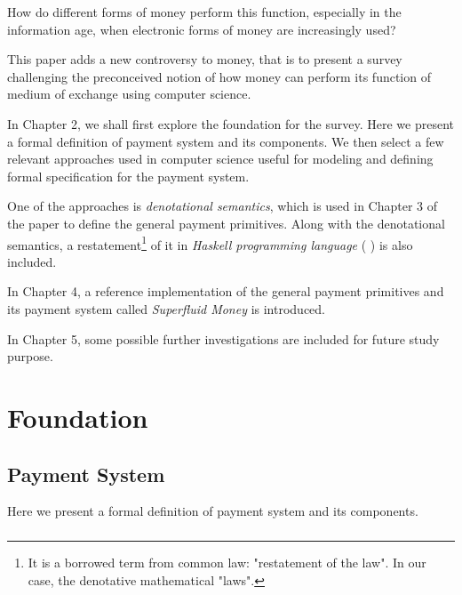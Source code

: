 \documentclass[a4paper,10pt]{report}
\begin{document}
How do different forms of money perform this function, especially in the information age, when electronic forms of money
are increasingly used?

This paper adds a new controversy to money, that is to present a survey challenging the preconceived notion of how money
can perform its function of medium of exchange using computer science.

In Chapter 2, we shall first explore the foundation for the survey. Here we present a formal definition of payment
system and its components. We then select a few relevant approaches used in computer science useful for modeling and
defining formal specification for the payment system.

One of the approaches is \textit{denotational semantics}, which is used in Chapter 3 of the paper to define the general
payment primitives. Along with the denotational semantics, a restatement\footnote{It is a borrowed term from common law:
"restatement of the law". In our case, the denotative mathematical "laws".} of it in \textit{Haskell programming
    language} (\cite{hudak1992report} \cite{jones2003haskell} \cite{marlow2010haskell}) is also included.

In Chapter 4, a reference implementation of the general payment primitives and its payment system called
\textit{Superfluid Money} is introduced.

In Chapter 5, some possible further investigations are included for future study purpose.

\chapter{Foundation}

\section{Payment System}

Here we present a formal definition of payment system and its components.

\paragraph{}
\end{document}
